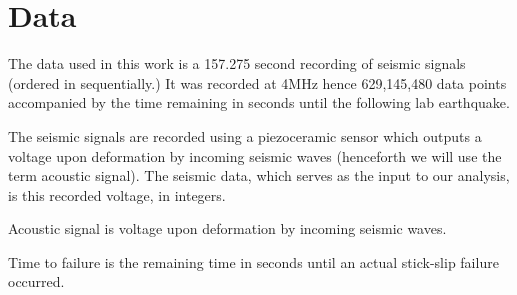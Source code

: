\documentclass[]{llncs} %
\begin{document}
\section{Data} 
The data used in this work is a 157.275 second recording of seismic signals (ordered in sequentially.) It was recorded at 4MHz hence 629,145,480 data points accompanied by the time remaining in seconds until the following lab earthquake. \par
The seismic signals are recorded using a piezoceramic sensor which outputs a voltage upon deformation by incoming seismic waves (henceforth we will use the term acoustic signal). The seismic data, which serves as the input to our analysis, is this recorded voltage, in integers. \par
Acoustic signal is voltage upon deformation by incoming seismic waves. \par
Time to failure is the remaining time in seconds until an actual stick-slip failure occurred. \par
\end{document}
